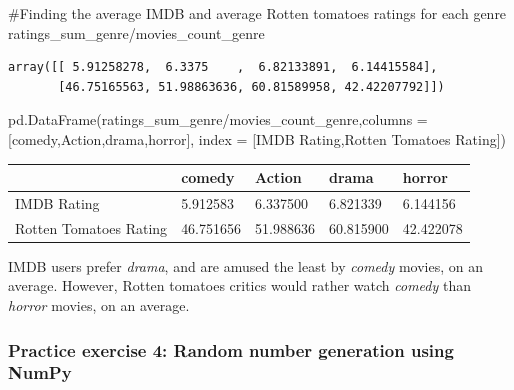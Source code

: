 \documentclass[
  letterpaper,
  DIV=11,
  numbers=noendperiod]{scrreprt}
\newenvironment{Shaded}{\begin{snugshade}}{\end{snugshade}}
\newcommand{\CommentTok}[1]{\textcolor[rgb]{0.37,0.37,0.37}{#1}}
\newcommand{\NormalTok}[1]{\textcolor[rgb]{0.00,0.23,0.31}{#1}}
\newcommand{\OperatorTok}[1]{\textcolor[rgb]{0.37,0.37,0.37}{#1}}
\newcommand{\StringTok}[1]{\textcolor[rgb]{0.13,0.47,0.30}{#1}}
\begin{document}
\begin{Shaded}
\begin{Highlighting}[]
\CommentTok{\#Finding the average IMDB and average Rotten tomatoes ratings for each genre}
\NormalTok{ratings\_sum\_genre}\OperatorTok{/}\NormalTok{movies\_count\_genre}
\end{Highlighting}
\end{Shaded}

\begin{verbatim}
array([[ 5.91258278,  6.3375    ,  6.82133891,  6.14415584],
       [46.75165563, 51.98863636, 60.81589958, 42.42207792]])
\end{verbatim}

\begin{Shaded}
\begin{Highlighting}[]
\NormalTok{pd.DataFrame(ratings\_sum\_genre}\OperatorTok{/}\NormalTok{movies\_count\_genre,columns }\OperatorTok{=}\NormalTok{ [}\StringTok{\textquotesingle{}comedy\textquotesingle{}}\NormalTok{,}\StringTok{\textquotesingle{}Action\textquotesingle{}}\NormalTok{,}\StringTok{\textquotesingle{}drama\textquotesingle{}}\NormalTok{,}\StringTok{\textquotesingle{}horror\textquotesingle{}}\NormalTok{],}
\NormalTok{             index }\OperatorTok{=}\NormalTok{ [}\StringTok{\textquotesingle{}IMDB Rating\textquotesingle{}}\NormalTok{,}\StringTok{\textquotesingle{}Rotten Tomatoes Rating\textquotesingle{}}\NormalTok{])}
\end{Highlighting}
\end{Shaded}

\begin{longtable}[]{@{}lllll@{}}
\toprule\noalign{}
& comedy & Action & drama & horror \\
\midrule\noalign{}
\endhead
\bottomrule\noalign{}
\endlastfoot
IMDB Rating & 5.912583 & 6.337500 & 6.821339 & 6.144156 \\
Rotten Tomatoes Rating & 46.751656 & 51.988636 & 60.815900 &
42.422078 \\
\end{longtable}

IMDB users prefer \emph{drama}, and are amused the least by
\emph{comedy} movies, on an average. However, Rotten tomatoes critics
would rather watch \emph{comedy} than \emph{horror} movies, on an
average.

\hypertarget{practice-exercise-4-random-number-generation-using-numpy}{%
\subsubsection{Practice exercise 4: Random number generation using
NumPy}\label{practice-exercise-4-random-number-generation-using-numpy}}
\end{document}
